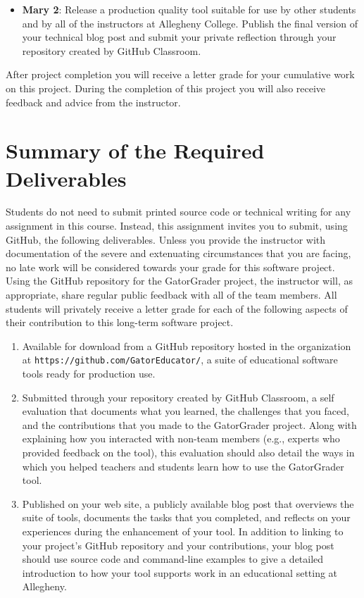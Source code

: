 \documentclass[11pt]{article}
\newcommand{\url}[1]{\lstinline{#1}}
\begin{document}
\begin{itemize}
  \item {\bf Mary 2}: Release a production quality tool suitable for use by
    other students and by all of the instructors at Allegheny College. Publish
    the final version of your technical blog post and submit your private
    reflection through your repository created by GitHub Classroom.

\end{itemize}

\noindent After project completion you will receive a letter grade for your
cumulative work on this project. During the completion of this project you will
also receive feedback and advice from the instructor.

\section*{Summary of the Required Deliverables}

\noindent Students do not need to submit printed source code or technical
writing for any assignment in this course. Instead, this assignment invites you
to submit, using GitHub, the following deliverables.
%
Unless you provide the instructor with documentation of the severe and
extenuating circumstances that you are facing, no late work will be considered
towards your grade for this software project.
%
Using the GitHub repository for the GatorGrader project, the instructor will, as
appropriate, share regular public feedback with all of the team members. All
students will privately receive a letter grade for each of the following aspects
of their contribution to this long-term software project.

\begin{enumerate}

\setlength{\itemsep}{0in}

\item Available for download from a GitHub repository hosted in the organization
  at \url{https://github.com/GatorEducator/}, a suite of educational software
  tools ready for production use.

\item Submitted through your repository created by GitHub Classroom, a self
  evaluation that documents what you learned, the challenges that you faced, and
  the contributions that you made to the GatorGrader project. Along with
  explaining how you interacted with non-team members (e.g., experts who
  provided feedback on the tool), this evaluation should also detail the ways in
  which you helped teachers and students learn how to use the GatorGrader tool.

\item Published on your web site, a publicly available blog post that overviews
  the suite of tools, documents the tasks that you completed, and reflects on
  your experiences during the enhancement of your tool. In addition to linking
  to your project's GitHub repository and your contributions, your blog post
  should use source code and command-line examples to give a detailed
  introduction to how your tool supports work in an educational setting at
  Allegheny.

\end{enumerate}
\end{document}
